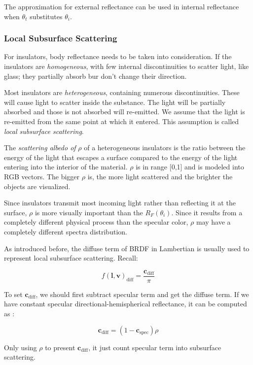 \documentclass[10pt, a4paper]{article}
\begin{document}
            The approximation for external reflectance can be used in internal reflectance when $\theta_t$ substitutes $\theta_i$.

        \subsubsection{Local Subsurface Scattering}
            For insulators, body reflectance needs to be taken into consideration. If the insulators are \emph{homogeneous}, with few internal discontinuities to scatter light, like glass; they partially absorb bur don't change their direction. 

            Most insulators are \emph{heterogeneous}, containing numerous discontinuities. These will cause light to scatter inside the substance. The light will be partially absorbed and those is not absorbed will re-emitted. We assume that the light is re-emitted from the same point at which it entered. This assumption is called \emph{local subsurface scattering}.
            
            The \emph{scattering albedo of} $\rho$ of a heterogeneous insulators is the ratio between the energy of the light that escapes a surface compared to the energy of the light entering into the interior of the material. $\rho$ is in range [0,1] and is modeled into RGB vectors. The bigger $\rho$ is, the more light scattered and the brighter the objects are visualized. 
            
            Since insulators transmit most incoming light rather than reflecting it at the surface, $\rho$ is more visually important than the $R_F(\theta_i)$. Since it results from a completely different physical process than the specular color, $\rho$ may have a completely different spectra distribution. 

            As introduced before, the diffuse term of BRDF in Lambertian is usually used to represent local subsurface scattering. Recall:  

            $$f(\textbf{l}, \textbf{v})_{\text{diff}} = \frac{\textbf{c}_{\text{diff}}}{\pi}$$

            To set $\textbf{c}_{\text{diff}}$, we should first subtract specular term and get the diffuse term. If we have constant specular directional-hemispherical reflectance, it can be computed as :

            $$\textbf{c}_{\text{diff}} = (1 - \textbf{c}_{\text{spec}})\rho$$

            Only using $\rho$ to present $\textbf{c}_{\text{diff}}$, it just count specular term into subsurface scattering. 
\end{document}
